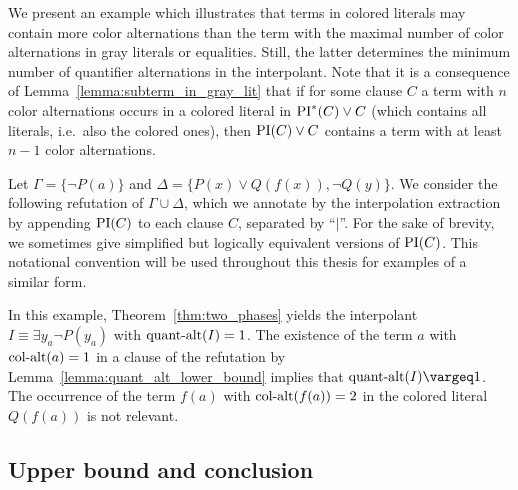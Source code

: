 We present an example which illustrates that terms in colored literals may contain more color alternations than the term with the maximal number of color alternations in gray literals or equalities.
Still, the latter determines the minimum number of quantifier alternations in the interpolant.
Note that it is a consequence of Lemma~\ref{lemma:subterm_in_gray_lit} that if for some clause $C$ a term with $n$ color alternations occurs in a colored literal in $\PI^*(C) \lor C$ (which contains all literals, i.e.\ also the colored ones), then $\PI(C)\lor C$ contains a term with at least $n-1$ color alternations.

\begin{exa}
	Let $\Gamma = \{ \lnot P(a) \}$ and $\Delta = \{ P(x) \lor Q(f(x)), \lnot Q(y) \}$.
	We consider the following refutation of $\Gamma \cup \Delta$, which we annotate by the interpolation extraction by appending $\PI(C)$ to each clause $C$, separated by ``$|$''.
	For the sake of brevity, we sometimes give simplified but logically equivalent versions of $\PI(C)$.
	This notational convention will be used throughout this thesis for examples of a similar form.
	\begin{prooftree}


	\end{prooftree}

	In this example, Theorem~\ref{thm:two_phases} yields the interpolant $I \equiv \exists y_a \lnot P(y_a)$ with $\qa(I) =\nolinebreak 1$.
	The existence of the term $a$ with $\ca(a) = 1$ in a clause of the refutation by Lemma~\ref{lemma:quant_alt_lower_bound} implies that $\qa(I) \vargeq 1$.
	The occurrence of the term $f(a)$ with $\ca(f(a)) = 2$ in the colored literal $Q(f(a))$ is not relevant.
\end{exa}

\subsection{Upper bound and conclusion}

